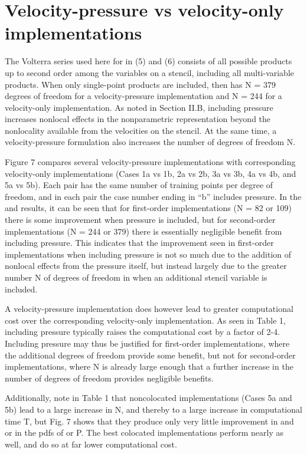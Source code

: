 \section{Velocity-pressure vs velocity-only implementations}

The Volterra series used here for   in (5) and (6) consists of all possible products up to second order among the variables on a   stencil, including all multi-variable products. When only single-point products are included, then   has N = 379 degrees of freedom for a velocity-pressure implementation and N = 244 for a velocity-only implementation. As noted in Section II.B, including pressure increases nonlocal effects in the nonparametric representation   beyond the nonlocality available from the velocities on the stencil. At the same time, a velocity-pressure formulation also increases the number of degrees of freedom N. 

Figure 7 compares several velocity-pressure implementations with corresponding velocity-only implementations (Cases 1a vs 1b, 2a vs 2b, 3a vs 3b, 4a vs 4b, and 5a vs 5b). Each pair has the same number   of training points per degree of freedom, and in each pair the case number ending in “b” includes pressure. In the   and   results, it can be seen that for first-order implementations (N = 82 or 109) there is some improvement when pressure is included, but for second-order implementations (N = 244 or 379) there is essentially negligible benefit from including pressure. This indicates that the improvement seen in first-order implementations when including pressure is not so much due to the addition of nonlocal effects from the pressure itself, but instead largely due to the greater number N of degrees of freedom in   when an additional stencil variable is included. 

A velocity-pressure implementation does however lead to greater computational cost over the corresponding velocity-only implementation. As seen in Table 1, including pressure typically raises the computational cost by a factor of 2-4. Including pressure may thus be justified for first-order implementations, where the additional degrees of freedom provide some benefit, but not for second-order implementations, where N is already large enough that a further increase in the number of degrees of freedom provides negligible benefits.

Additionally, note in Table 1 that noncolocated implementations (Cases 5a and 5b) lead to a large increase in N, and thereby to a large increase in computational time T, but Fig. 7 shows that they produce only very little improvement in   and   or in the pdfs of   or P. The best colocated implementations perform nearly as well, and do so at far lower computational cost.

